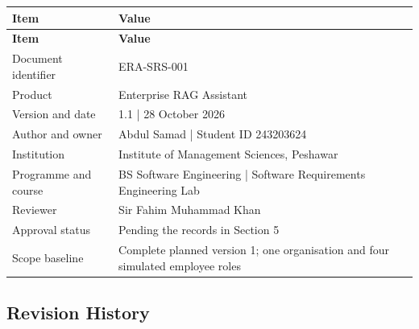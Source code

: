\documentclass[11pt,letterpaper]{article}
\begin{document}
\begin{longtable}{|P{\arrayrulewidth\relax}|P{\arrayrulewidth\relax}|}

\hline{}

\textbf{Item} & \textbf{Value} \\ \hline

\endfirsthead

\hline{}

\textbf{Item} & \textbf{Value} \\ \hline

\endhead

\hline\endfoot

\hline\endlastfoot

Document identifier & ERA-SRS-001 \\ \hline

Product & Enterprise RAG Assistant \\ \hline

Version and date & 1.1 | 28 October 2026 \\ \hline

Author and owner & Abdul Samad | Student ID 243203624 \\ \hline

Institution & Institute of Management Sciences, Peshawar \\ \hline

Programme and course & BS Software Engineering | Software Requirements Engineering Lab \\ \hline

Reviewer & Sir Fahim Muhammad Khan \\ \hline

Approval status & Pending the records in Section 5 \\ \hline

Scope baseline & Complete planned version 1; one organisation and four simulated employee roles \\ \hline

\end{longtable}

\endgroup

\subsection*{Revision History}

\begingroup\small
\end{document}
